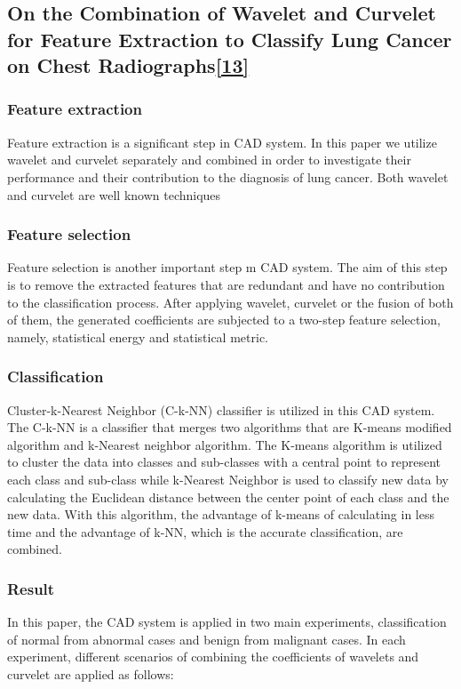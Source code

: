 \documentclass[hidelinks,12pt]{article}
\begin{document}
\newpage
\subsection{On the Combination of Wavelet and Curvelet for Feature Extraction
to Classify Lung Cancer on Chest Radiographs\hyperref[13]{[13]}}

\subsubsection{Feature extraction}
Feature extraction is a significant step in CAD system. In
this paper we utilize wavelet and curvelet separately and
combined in order to investigate their performance and their
contribution to the diagnosis of lung cancer. Both wavelet
and curvelet are well known techniques

\subsubsection{Feature selection}
Feature selection is another important step m CAD
system. The aim of this step is to remove the extracted
features that are redundant and have no contribution to the
classification process. After applying wavelet, curvelet or the
fusion of both of them, the generated coefficients are
subjected to a two-step feature selection, namely, statistical
energy and statistical metric.

\subsubsection{Classification}
Cluster-k-Nearest Neighbor (C-k-NN) classifier is utilized
in this CAD system. The C-k-NN is a classifier that merges
two algorithms that are K-means modified algorithm
and k-Nearest neighbor algorithm. The K-means algorithm
is utilized to cluster the data into classes and sub-classes
with a central point to represent each class and sub-class
while k-Nearest Neighbor is used to classify new data by
calculating the Euclidean distance between the center point
of each class and the new data. With this algorithm, the
advantage of k-means of calculating in less time and the
advantage of k-NN, which is the accurate classification, are
combined.


\subsubsection{Result}

In this paper, the CAD system is applied in two main
experiments, classification of normal from abnormal cases
and benign from malignant cases. In each experiment,
different scenarios of combining the coefficients of wavelets
and curvelet are applied as follows:
\end{document}
